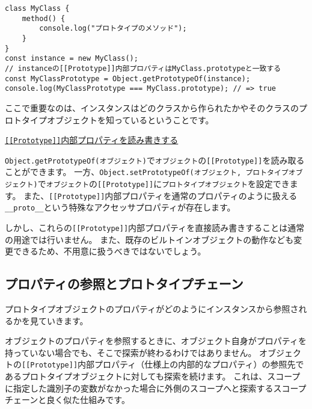 \begin{lstlisting}
class MyClass {
    method() {
        console.log("プロトタイプのメソッド");
    }
}
const instance = new MyClass();
// instanceの[[Prototype]]内部プロパティはMyClass.prototypeと一致する
const MyClassPrototype = Object.getPrototypeOf(instance);
console.log(MyClassPrototype === MyClass.prototype); // => true
\end{lstlisting}

ここで重要なのは、インスタンスはどのクラスから作られたかやそのクラスのプロトタイプオブジェクトを知っているということです。

\begin{note}{}
\hypertarget{inner-property}{%
\underline{\texttt{{[}{[}Prototype{]}{]}}内部プロパティを読み書きする}\label{inner-property}}

\texttt{Object.getPrototypeOf(オブジェクト)}で\texttt{オブジェクト}の\texttt{[[Prototype]]}を読み取ることができます。
一方、\texttt{Object.setPrototypeOf(オブジェクト, プロトタイプオブジェクト)}で\texttt{オブジェクト}の\texttt{[[Prototype]]}に\texttt{プロトタイプオブジェクト}を設定できます。
また、\texttt{[[Prototype]]}内部プロパティを通常のプロパティのように扱える\texttt{\_\_proto\_\_}という特殊なアクセッサプロパティが存在します。

しかし、これらの\texttt{[[Prototype]]}内部プロパティを直接読み書きすることは通常の用途では行いません。
また、既存のビルトインオブジェクトの動作なども変更できるため、不用意に扱うべきではないでしょう。
\end{note}

\hypertarget{read-prototype-chain}{%
\subsection{プロパティの参照とプロトタイプチェーン}\label{read-prototype-chain}}

プロトタイプオブジェクトのプロパティがどのようにインスタンスから参照されるかを見ていきます。

オブジェクトのプロパティを参照するときに、オブジェクト自身がプロパティを持っていない場合でも、そこで探索が終わるわけではありません。
オブジェクトの\texttt{[[Prototype]]}内部プロパティ（仕様上の内部的なプロパティ）の参照先であるプロトタイプオブジェクトに対しても探索を続けます。
これは、スコープに指定した識別子の変数がなかった場合に外側のスコープへと探索するスコープチェーンと良く似た仕組みです。

